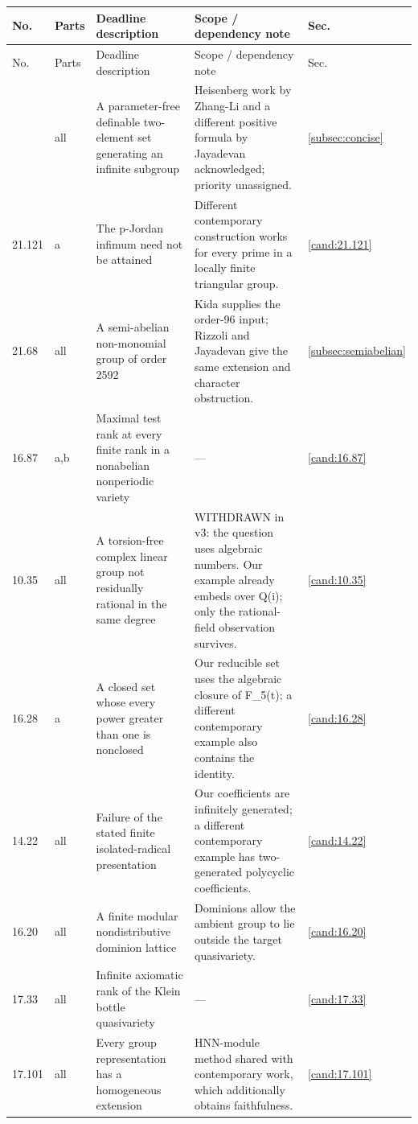 \small
\begin{longtable}{@{}p{}p{}>{\raggedright\arraybackslash}p{}>{\raggedright\arraybackslash}p{}p{}@{}}
\toprule
No. & Parts & Deadline description & Scope / dependency note & Sec.\\
\midrule
\endfirsthead
\toprule
No. & Parts & Deadline description & Scope / dependency note & Sec.\\
\midrule
\endhead
\bottomrule
\endfoot
21.106 & all & A parameter-free definable two-element set generating an infinite subgroup & Heisenberg work by Zhang-Li and a different positive formula by Jayadevan acknowledged; priority unassigned. & \ref{subsec:concise} \\
21.121 & a & The p-Jordan infimum need not be attained & Different contemporary construction works for every prime in a locally finite triangular group. & \ref{cand:21.121} \\
21.68 & all & A semi-abelian non-monomial group of order 2592 & Kida supplies the order-96 input; Rizzoli and Jayadevan give the same extension and character obstruction. & \ref{subsec:semiabelian} \\
16.87 & a,b & Maximal test rank at every finite rank in a nonabelian nonperiodic variety & --- & \ref{cand:16.87} \\
10.35 & all & A torsion-free complex linear group not residually rational in the same degree & WITHDRAWN in v3: the question uses algebraic numbers. Our example already embeds over Q(i); only the rational-field observation survives. & \ref{cand:10.35} \\
16.28 & a & A closed set whose every power greater than one is nonclosed & Our reducible set uses the algebraic closure of F\_5(t); a different contemporary example also contains the identity. & \ref{cand:16.28} \\
14.22 & all & Failure of the stated finite isolated-radical presentation & Our coefficients are infinitely generated; a different contemporary example has two-generated polycyclic coefficients. & \ref{cand:14.22} \\
16.20 & all & A finite modular nondistributive dominion lattice & Dominions allow the ambient group to lie outside the target quasivariety. & \ref{cand:16.20} \\
17.33 & all & Infinite axiomatic rank of the Klein bottle quasivariety & --- & \ref{cand:17.33} \\
17.101 & all & Every group representation has a homogeneous extension & HNN-module method shared with contemporary work, which additionally obtains faithfulness. & \ref{cand:17.101} \\

\end{longtable}
